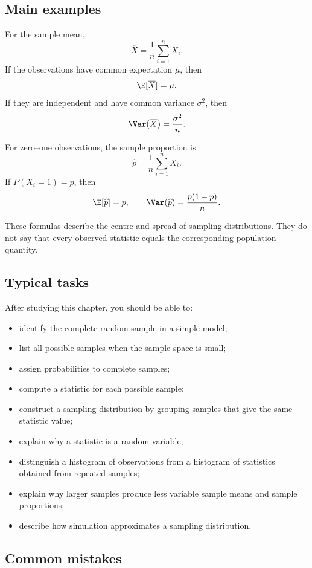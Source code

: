 \subsection*{Main examples}

For the sample mean,
\[
\overline X=\frac1n\sum_{i=1}^nX_i.
\]
If the observations have common expectation \(\mu\), then
\[
\E[\overline X]=\mu.
\]
If they are independent and have common variance \(\sigma^2\), then
\[
\Var(\overline X)=\frac{\sigma^2}{n}.
\]

For zero--one observations, the sample proportion is
\[
\widehat p=\frac1n\sum_{i=1}^nX_i.
\]
If \(P(X_i=1)=p\), then
\[
\E[\widehat p]=p,
\qquad
\Var(\widehat p)=\frac{p(1-p)}{n}.
\]

These formulas describe the centre and spread of sampling distributions. They do
not say that every observed statistic equals the corresponding population
quantity.

\subsection*{Typical tasks}

After studying this chapter, you should be able to:

\begin{itemize}
    \item identify the complete random sample in a simple model;
    \item list all possible samples when the sample space is small;
    \item assign probabilities to complete samples;
    \item compute a statistic for each possible sample;
    \item construct a sampling distribution by grouping samples that give the
    same statistic value;
    \item explain why a statistic is a random variable;
    \item distinguish a histogram of observations from a histogram of statistics
    obtained from repeated samples;
    \item explain why larger samples produce less variable sample means and
    sample proportions;
    \item describe how simulation approximates a sampling distribution.
\end{itemize}

\subsection*{Common mistakes}

